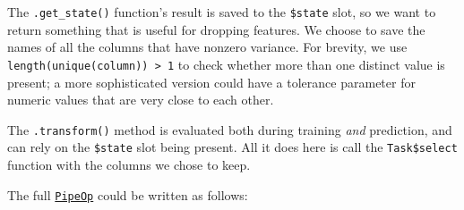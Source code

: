 \documentclass[
]{scrbook}
\newenvironment{Shaded}{\begin{snugshade}}{\end{snugshade}}
\newcommand{\AttributeTok}[1]{\textcolor[rgb]{0.77,0.63,0.00}{#1}}
\newcommand{\ControlFlowTok}[1]{\textcolor[rgb]{0.13,0.29,0.53}{\textbf{#1}}}
\newcommand{\DecValTok}[1]{\textcolor[rgb]{0.00,0.00,0.81}{#1}}
\newcommand{\FunctionTok}[1]{\textcolor[rgb]{0.00,0.00,0.00}{#1}}
\newcommand{\NormalTok}[1]{#1}
\newcommand{\OtherTok}[1]{\textcolor[rgb]{0.56,0.35,0.01}{#1}}
\newcommand{\SpecialCharTok}[1]{\textcolor[rgb]{0.00,0.00,0.00}{#1}}
\newcommand{\StringTok}[1]{\textcolor[rgb]{0.31,0.60,0.02}{#1}}
\renewenvironment{Shaded} {\begin{snugshade}\small} {\end{snugshade}}
\begin{document}
The \texttt{.get\_state()} function's result is saved to the \texttt{\$state} slot, so we want to return something that is useful for dropping features.
We choose to save the names of all the columns that have nonzero variance.
For brevity, we use \texttt{length(unique(column))\ \textgreater{}\ 1} to check whether more than one distinct value is present; a more sophisticated version could have a tolerance parameter for numeric values that are very close to each other.

The \texttt{.transform()} method is evaluated both during training \emph{and} prediction, and can rely on the \texttt{\$state} slot being present.
All it does here is call the \texttt{Task\$select} function with the columns we chose to keep.

The full \href{https://mlr3pipelines.mlr-org.com/reference/PipeOp.html}{\texttt{PipeOp}} could be written as follows:

\begin{Shaded}
\end{Shaded}
\end{document}
